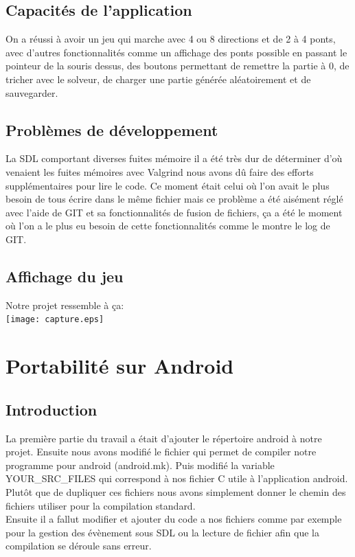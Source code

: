 \documentclass[12pt]{report}
\begin{document}
\section{Capacités de l'application}
On a réussi à avoir un jeu qui marche avec 4 ou 8 directions et de 2 à 4 ponts, avec d'autres fonctionnalités comme un affichage des ponts possible en passant le pointeur de la souris dessus, des boutons permettant de remettre la partie à 0, de tricher avec le solveur, de charger une partie générée aléatoirement et de sauvegarder.

\section{Problèmes de développement}
La SDL comportant diverses fuites mémoire il a été très dur de déterminer d'où venaient les fuites mémoires avec Valgrind nous avons dû faire des efforts supplémentaires pour lire le code. Ce moment était celui où l'on avait le plus besoin de tous écrire dans le même fichier mais ce problème a été aisément réglé avec l'aide de GIT et sa fonctionnalités de fusion de fichiers, ça a été le moment où l'on a le plus eu besoin de cette fonctionnalités comme le montre le log de GIT.

\section{Affichage du jeu}
Notre projet ressemble à ça:\\

\texttt{[image: capture.eps]}



\chapter{Portabilité sur Android}
\section{Introduction}
\textnormal{La première partie du travail a était d'ajouter le répertoire android à notre projet. Ensuite nous avons modifié le fichier qui permet de compiler notre programme pour android (android.mk). Puis modifié la variable YOUR\_SRC\_FILES qui correspond à nos fichier C utile à l'application android. Plutôt que de dupliquer ces fichiers nous avons simplement donner le chemin des fichiers utiliser pour la compilation standard.\\Ensuite il a fallut modifier et ajouter du code a nos fichiers comme par exemple pour la gestion des évènement sous SDL ou la lecture de fichier afin que la compilation se déroule sans erreur.}
\end{document}
